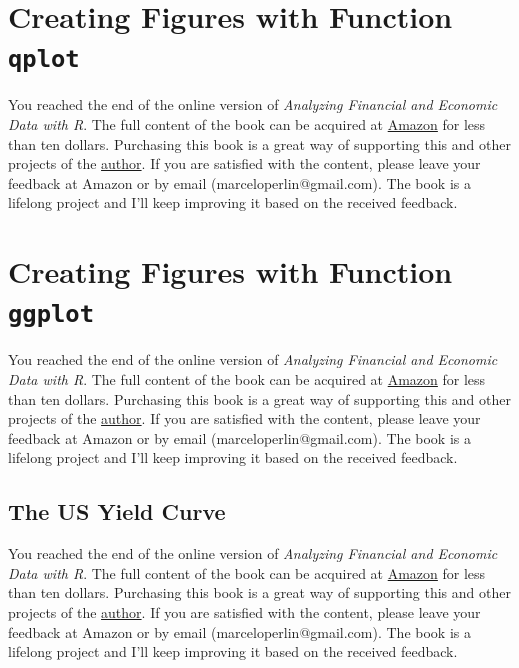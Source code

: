 \documentclass[
  12pt,
]{book}
\newenvironment{pleasebuyit}
{\begin{noteblock}
		
	} {\end{noteblock}}
\begin{document}
\hypertarget{creating-figures-with-function-qplot}{%
\section{\texorpdfstring{Creating Figures with Function \texttt{qplot}}{Creating Figures with Function qplot}}\label{creating-figures-with-function-qplot}}

\begin{pleasebuyit}
You reached the end of the online version of \emph{Analyzing Financial
and Economic Data with R}. The full content of the book can be acquired
at \href{https://www.amazon.com/dp/B084LSNXMN}{Amazon} for less than ten
dollars. Purchasing this book is a great way of supporting this and
other projects of the \href{https://www.msperlin.com/}{author}. If you
are satisfied with the content, please leave your feedback at Amazon or
by email (marceloperlin@gmail.com). The book is a lifelong project and
I'll keep improving it based on the received feedback.
\end{pleasebuyit}

\hypertarget{ggplot}{%
\section{\texorpdfstring{Creating Figures with Function \texttt{ggplot}}{Creating Figures with Function ggplot}}\label{ggplot}}

\begin{pleasebuyit}
You reached the end of the online version of \emph{Analyzing Financial
and Economic Data with R}. The full content of the book can be acquired
at \href{https://www.amazon.com/dp/B084LSNXMN}{Amazon} for less than ten
dollars. Purchasing this book is a great way of supporting this and
other projects of the \href{https://www.msperlin.com/}{author}. If you
are satisfied with the content, please leave your feedback at Amazon or
by email (marceloperlin@gmail.com). The book is a lifelong project and
I'll keep improving it based on the received feedback.
\end{pleasebuyit}

\hypertarget{the-us-yield-curve}{%
\subsection{The US Yield Curve}\label{the-us-yield-curve}}

\begin{pleasebuyit}
You reached the end of the online version of \emph{Analyzing Financial
and Economic Data with R}. The full content of the book can be acquired
at \href{https://www.amazon.com/dp/B084LSNXMN}{Amazon} for less than ten
dollars. Purchasing this book is a great way of supporting this and
other projects of the \href{https://www.msperlin.com/}{author}. If you
are satisfied with the content, please leave your feedback at Amazon or
by email (marceloperlin@gmail.com). The book is a lifelong project and
I'll keep improving it based on the received feedback.
\end{pleasebuyit}
\end{document}
